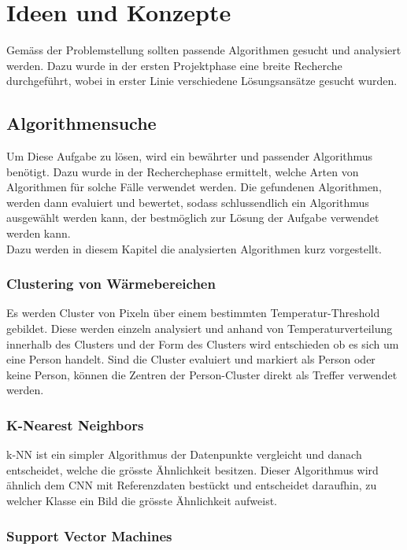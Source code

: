\chapter{Ideen und Konzepte}
\label{ch:ideasAndConcepts}

Gemäss der Problemstellung sollten passende Algorithmen gesucht und analysiert werden. Dazu wurde in der ersten Projektphase eine breite Recherche durchgeführt, wobei in erster Linie verschiedene Lösungsansätze gesucht wurden.

\section{Algorithmensuche}

Um Diese Aufgabe zu lösen, wird ein bewährter und passender Algorithmus benötigt. Dazu wurde in der Recherchephase ermittelt, welche Arten von Algorithmen für solche Fälle verwendet werden. Die gefundenen Algorithmen, werden dann evaluiert und bewertet, sodass schlussendlich ein Algorithmus ausgewählt werden kann, der bestmöglich zur Lösung der Aufgabe verwendet werden kann.\\
Dazu werden in diesem Kapitel die analysierten Algorithmen kurz vorgestellt.

\subsection{Clustering von Wärmebereichen}

Es werden Cluster von Pixeln über einem bestimmten Temperatur-Threshold gebildet. Diese werden einzeln analysiert und anhand von Temperaturverteilung innerhalb des Clusters und der Form des Clusters wird entschieden ob es sich um eine Person handelt. Sind die Cluster evaluiert und markiert als Person oder keine Person, können die Zentren der Person-Cluster direkt als Treffer verwendet werden.


\subsection{K-Nearest Neighbors}

\gls{k-NN} ist ein simpler Algorithmus der Datenpunkte vergleicht und danach entscheidet, welche die grösste Ähnlichkeit besitzen. Dieser Algorithmus wird ähnlich dem \gls{CNN} mit Referenzdaten bestückt und entscheidet daraufhin, zu welcher Klasse ein Bild die grösste Ähnlichkeit aufweist.

\subsection{Support Vector Machines}

